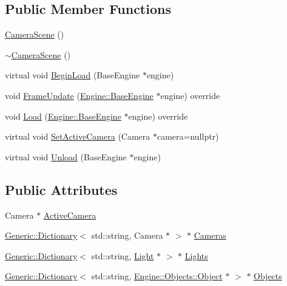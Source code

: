 \subsection*{Public Member Functions}
\begin{DoxyCompactItemize}
\item 
\mbox{\hyperlink{classApplication_1_1Scenes_1_1CameraScene_a6276ab9be1ea87015c7508668e878edf}{Camera\+Scene}} ()
\item 
\mbox{\hyperlink{classApplication_1_1Scenes_1_1CameraScene_a7ae326096600efbfb172225cb53a0975}{$\sim$\+Camera\+Scene}} ()
\item 
virtual void \mbox{\hyperlink{classEngine_1_1Components_1_1Scene_af18bd334fe66952b8d79b8e9e99ab2d8}{Begin\+Load}} (Base\+Engine $\ast$engine)
\item 
void \mbox{\hyperlink{classApplication_1_1Scenes_1_1CameraScene_a92eb1a3eab4de7d18ca108e4aefd7fc7}{Frame\+Update}} (\mbox{\hyperlink{classEngine_1_1BaseEngine}{Engine\+::\+Base\+Engine}} $\ast$engine) override
\item 
void \mbox{\hyperlink{classApplication_1_1Scenes_1_1CameraScene_a86f30a60a125f491176ecfca46cd6b8a}{Load}} (\mbox{\hyperlink{classEngine_1_1BaseEngine}{Engine\+::\+Base\+Engine}} $\ast$engine) override
\item 
virtual void \mbox{\hyperlink{classEngine_1_1Components_1_1Scene_a936218df56c481f3aa12d684cee038f3}{Set\+Active\+Camera}} (Camera $\ast$camera=nullptr)
\item 
virtual void \mbox{\hyperlink{classEngine_1_1Components_1_1Scene_a064ce89da5daa483369c3253f04c9d21}{Unload}} (Base\+Engine $\ast$engine)
\end{DoxyCompactItemize}
\subsection*{Public Attributes}
\begin{DoxyCompactItemize}
\item 
Camera $\ast$ \mbox{\hyperlink{classEngine_1_1Components_1_1Scene_a9408befee37d89e2c001d25b9e4ed75a}{Active\+Camera}}
\item 
\mbox{\hyperlink{classGeneric_1_1Dictionary}{Generic\+::\+Dictionary}}$<$ std\+::string, Camera $\ast$ $>$ $\ast$ \mbox{\hyperlink{classEngine_1_1Components_1_1Scene_aea98ff1ced88ee859878b504e9a2a362}{Cameras}}
\item 
\mbox{\hyperlink{classGeneric_1_1Dictionary}{Generic\+::\+Dictionary}}$<$ std\+::string, \mbox{\hyperlink{classLight}{Light}} $\ast$ $>$ $\ast$ \mbox{\hyperlink{classEngine_1_1Components_1_1Scene_a00f60de2f6c72242a7af0076a3b75e5e}{Lights}}
\item 
\mbox{\hyperlink{classGeneric_1_1Dictionary}{Generic\+::\+Dictionary}}$<$ std\+::string, \mbox{\hyperlink{classEngine_1_1Objects_1_1Object}{Engine\+::\+Objects\+::\+Object}} $\ast$ $>$ $\ast$ \mbox{\hyperlink{classEngine_1_1Components_1_1Scene_a23481feabaaa56bf5613765db03af4da}{Objects}}
\end{DoxyCompactItemize}
